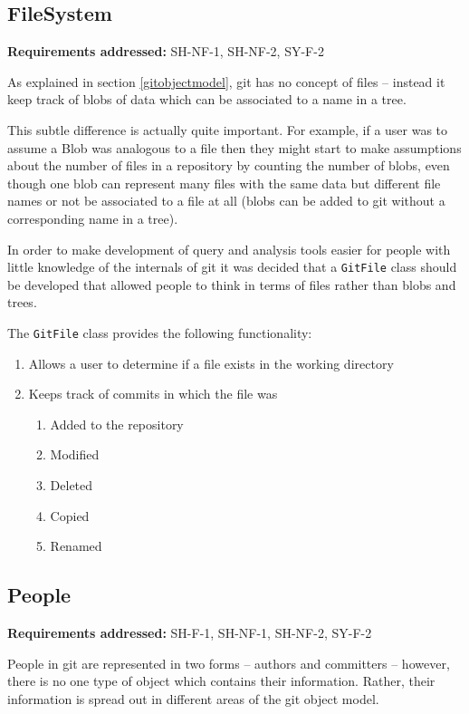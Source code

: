 \documentclass[11pt]{book}
\newcommand{\code}[1]{\texttt{#1}}
\begin{document}
\subsection{FileSystem}
\begin{tcolorbox}
\textbf{Requirements addressed:} SH-NF-1, SH-NF-2, SY-F-2
\end{tcolorbox}
As explained in section \ref{gitobjectmodel}, git has no concept of files -- instead it keep track of blobs of data which can be associated to a name in a tree.

This subtle difference is actually quite important. For example, if a user was to assume a Blob was analogous to a file then they might start to make assumptions about the number of files in a repository by counting the number of blobs, even though one blob can represent many files with the same data but different file names or not be associated to a file at all (blobs can be added to git without a corresponding name in a tree).

In order to make development of query and analysis tools easier for people with little knowledge of the internals of git it was decided that a \code{GitFile} class should be developed that allowed people to think in terms of files rather than blobs and trees. 

The \code{GitFile} class provides the following functionality:

\begin{enumerate}
	\item Allows a user to determine if a file exists in the working directory
	\item Keeps track of commits in which the file was 
	\begin{enumerate}
	\item Added to the repository
	\item Modified
	\item Deleted
	\item Copied
	\item Renamed
	\end{enumerate}
\end{enumerate}

\subsection{People}
\begin{tcolorbox}
\textbf{Requirements addressed:} SH-F-1, SH-NF-1, SH-NF-2, SY-F-2
\end{tcolorbox}
People in git are represented in two forms -- authors and committers -- however, there is no one type of object which contains their information. Rather, their information is spread out in different areas of the git object model. 
\end{document}
